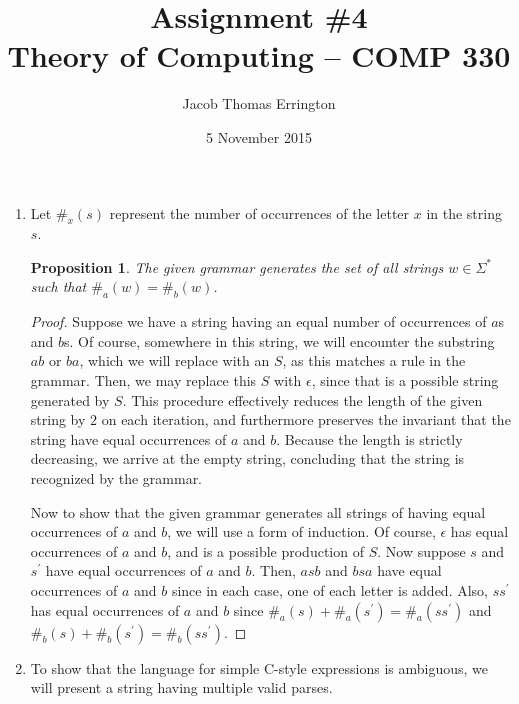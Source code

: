 \documentclass[letterpaper,11pt]{article}
\author{Jacob Thomas Errington}
\date{5 November 2015}
\title{Assignment \#4\\Theory of Computing -- COMP 330}
\newtheorem{proposition}{Proposition}
\begin{document}
\maketitle

\begin{enumerate}
    \item Let $\#_x(s)$ represent the number of occurrences of the letter $x$
        in the string $s$.

        \begin{proposition}
            The given grammar generates the set of all strings $w \in \Sigma^*$
            such that $\#_a(w) = \#_b(w)$.
        \end{proposition}

        \begin{proof}
            Suppose we have a string having an equal number of occurrences of
            $a$s and $b$s. Of course, somewhere in this string, we will
            encounter the substring $ab$ or $ba$, which we will replace with an
            $S$, as this matches a rule in the grammar. Then, we may replace
            this $S$ with $\epsilon$, since that is a possible string generated
            by $S$. This procedure effectively reduces the length of the given
            string by $2$ on each iteration, and furthermore preserves the
            invariant that the string have equal occurrences of $a$ and $b$.
            Because the length is strictly decreasing, we arrive at the empty
            string, concluding that the string is recognized by the grammar.

            Now to show that the given grammar generates all strings of having
            equal occurrences of $a$ and $b$, we will use a form of induction.
            Of course, $\epsilon$ has equal occurrences of $a$ and $b$, and is
            a possible production of $S$. Now suppose $s$ and $s^\prime$ have
            equal occurrences of $a$ and $b$. Then, $asb$ and $bsa$ have equal
            occurrences of $a$ and $b$ since in each case, one of each letter
            is added. Also, $ss^\prime$ has equal occurrences of $a$ and $b$
            since $\#_a(s) + \#_a(s^\prime) = \#_a(ss^\prime)$ and
            $\#_b(s) + \#_b(s^\prime) = \#_b(ss^\prime)$.
        \end{proof}

    \item
        To show that the language for simple C-style expressions is ambiguous,
        we will present a string having multiple valid parses.


\end{enumerate}
\end{document}
